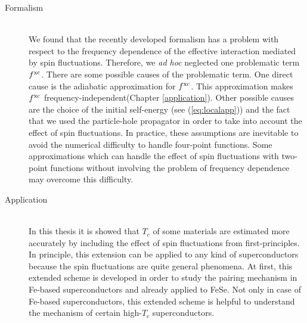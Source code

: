 \begin{description}
	\item[Formalism] \mbox{}\\
We found that the recently developed formalism has a problem with respect to the frequency dependence
of the effective interaction mediated by spin fluctuations. Therefore, we {\it ad hoc} neglected
one problematic term $f^{\rm xc}$. 
There are some possible causes of the problematic term. One direct cause is the adiabatic 
approximation for $f^{\rm xc}$. This approximation makes $f^{\rm xc}$ frequency-independent(Chapter 
\ref{application}).
Other possible causes are the choice of the initial self-energy (see (\ref{eq:localapp})) and 
the fact that we used the particle-hole propagator in order to take into account the effect of
spin fluctuations. In practice, these assumptions are inevitable to avoid the numerical difficulty 
to handle four-point functions. Some approximations which can handle the effect of spin 
fluctuations with two-point functions without involving the problem of frequency dependence may 
overcome this difficulty.

\item[Application] \mbox{}\\
	In this thesis it is showed that $T_c$ of some materials are estimated more accurately by 
	including the effect of spin fluctuations from first-principles. 
	In principle, this extension can be applied to any 
	kind of superconductors because the spin fluctuations are quite general phenomena.
	At first, this extended scheme is developed in order to study the pairing mechanism in 
	Fe-based superconductors and already applied to FeSe\cite{Essenberger2016, Lischner2015}. 
	Not only in case of Fe-based superconductors, this extended scheme is helpful to understand 
	the mechanism of certain high-$T_c$ superconductors.


\end{description}



